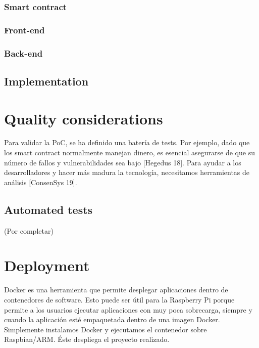 \documentclass[12pt]{amsart}
\begin{document}
\begin{multicols}{2}



\vspace{0.35cm}

\subsubsection{Smart contract}
\subsubsection{Front-end} \label{ch:front-end}
\subsubsection{Back-end} \label{ch:back-end}

\subsection{Implementation} \label{ch:implementation}


\section{Quality considerations}\label{sec:proofs}
Para validar la PoC, se ha definido una batería de tests. Por ejemplo, dado que los smart contract normalmente manejan dinero, es esencial asegurarse de que su número de fallos y vulnerabilidades sea bajo [Hegedus 18]. Para ayudar a los desarrolladores y hacer más madura la tecnología, necesitamos herramientas de análisis [ConsenSys 19].
\subsection{Automated tests} \label{ch:tests}
(Por completar)

\section{Deployment}\label{sec:deploy}
Docker es una herramienta que permite desplegar aplicaciones dentro de contenedores de software. Esto puede ser útil para la Raspberry Pi porque permite a los usuarios ejecutar aplicaciones con muy poca sobrecarga, siempre y cuando la aplicación esté empaquetada dentro de una imagen Docker. Simplemente instalamos Docker y ejecutamos el contenedor sobre Raspbian/ARM. Éste despliega el proyecto realizado.


\end{multicols}
\end{document}
